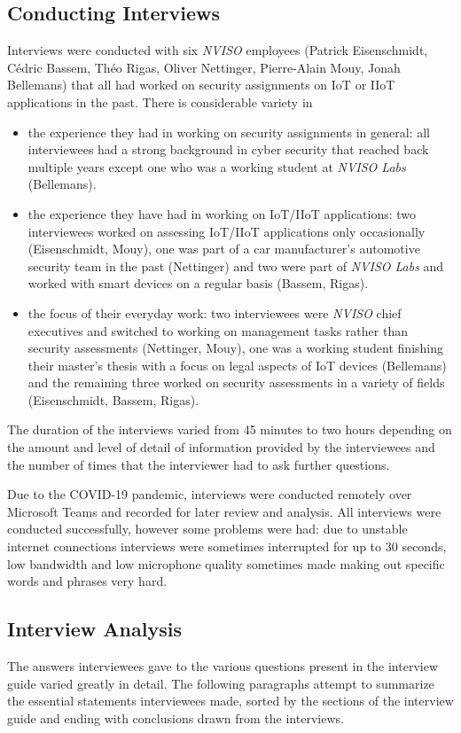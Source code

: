 \subsection{Conducting Interviews}
Interviews were conducted with six
\emph{NVISO} employees (Patrick Eisenschmidt, Cédric Bassem, Théo Rigas, Oliver Nettinger, Pierre-Alain Mouy, Jonah Bellemans) that all had worked on security assignments on \ac{IoT} or \ac{IIoT} applications in the past. There is considerable variety in
\begin{itemize}
    \item the experience they had in working on security assignments in general: all interviewees had a strong background in cyber security that reached back multiple years except one who was a working student at \emph{NVISO Labs} (Bellemans).
    \item the experience they have had in working on \ac{IoT}/\ac{IIoT} applications: two interviewees worked on assessing \ac{IoT}/\ac{IIoT} applications only occasionally (Eisenschmidt, Mouy), one was part of a car manufacturer's automotive security team in the past (Nettinger) and two were part of \emph{NVISO Labs} and worked with smart devices on a regular basis (Bassem, Rigas).
    \item the focus of their everyday work: two interviewees were \emph{NVISO} chief executives and switched to working on management tasks rather than security assessments (Nettinger, Mouy), one was a working student finishing their master's thesis with a focus on legal aspects of \ac{IoT} devices (Bellemans) and the remaining three worked on security assessments in a variety of fields (Eisenschmidt, Bassem, Rigas).
\end{itemize}
The duration of the interviews varied from 45 minutes to two hours depending on the amount and level of detail of information provided by the interviewees and the number of times that the interviewer had to ask further questions.\par
Due to the COVID-19 pandemic, interviews were conducted remotely over Microsoft Teams and recorded for later review and analysis. All interviews were conducted successfully, however some problems were had: due to unstable internet connections interviews were sometimes interrupted for up to 30 seconds, low bandwidth and low microphone quality sometimes made making out specific words and phrases very hard.

\subsection{Interview Analysis}
The answers interviewees gave to the various questions present in the interview guide varied greatly in detail. The following paragraphs attempt to summarize the essential statements interviewees made, sorted by the sections of the interview guide and ending with conclusions drawn from the interviews.

